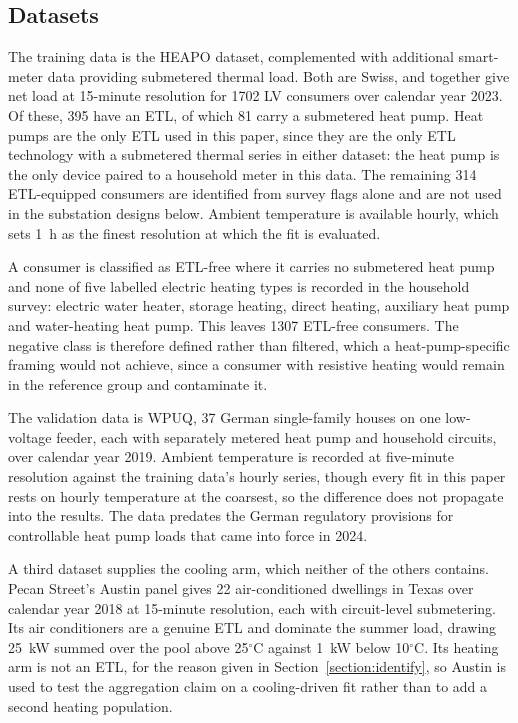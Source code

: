 \documentclass[9pt,journal,a4]{IEEEtran}
\begin{document}
\subsection{Datasets}
\label{subsection:data}

The training data is the HEAPO dataset, complemented with additional smart-meter data providing submetered thermal load. Both are Swiss, and together give net load at 15-minute resolution for 1702 LV consumers over calendar year 2023. Of these, 395 have an ETL, of which 81 carry a submetered heat pump. Heat pumps are the only ETL used in this paper, since they are the only ETL technology with a submetered thermal series in either dataset: the heat pump is the only device paired to a household meter in this data. The remaining 314 ETL-equipped consumers are identified from survey flags alone and are not used in the substation designs below. Ambient temperature is available hourly, which sets 1~h as the finest resolution at which the fit is evaluated.

A consumer is classified as ETL-free where it carries no submetered heat pump and none of five labelled electric heating types is recorded in the household survey: electric water heater, storage heating, direct heating, auxiliary heat pump and water-heating heat pump. This leaves 1307 ETL-free consumers. The negative class is therefore defined rather than filtered, which a heat-pump-specific framing would not achieve, since a consumer with resistive heating would remain in the reference group and contaminate it.

The validation data is WPUQ, 37 German single-family houses on one low-voltage feeder, each with separately metered heat pump and household circuits, over calendar year 2019. Ambient temperature is recorded at five-minute resolution against the training data's hourly series, though every fit in this paper rests on hourly temperature at the coarsest, so the difference does not propagate into the results. The data predates the German regulatory provisions for controllable heat pump loads that came into force in 2024.

A third dataset supplies the cooling arm, which neither of the others contains. Pecan Street's Austin panel gives 22 air-conditioned dwellings in Texas over calendar year 2018 at 15-minute resolution, each with circuit-level submetering. Its air conditioners are a genuine ETL and dominate the summer load, drawing 25~kW summed over the pool above 25$^\circ$C against 1~kW below 10$^\circ$C. Its heating arm is not an ETL, for the reason given in Section~\ref{section:identify}, so Austin is used to test the aggregation claim on a cooling-driven fit rather than to add a second heating population.
\end{document}
